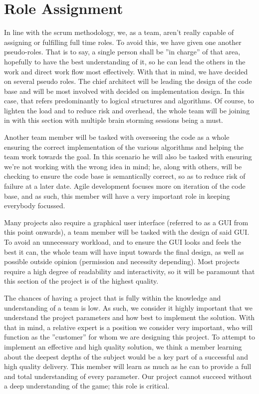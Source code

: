 \documentclass[11pt]{article}
\begin{document}
\section{Role Assignment}

In line with the scrum methodology, we, as a team, aren’t really 
capable of assigning or fulfilling full time roles. To avoid this, 
we have given one another pseudo-roles. That is to say, a single person 
shall be ”in charge” of that area, hopefully to have the best 
understanding of it, so he can lead the others in the work and direct 
work flow most effectively.
	With that in mind, we have decided on several pseudo roles. The 
chief architect will be leading the design of the code base and will be 
most involved with decided on implementation design. In this case, that 
refers predominantly to logical structures and algorithms. Of course, 
to lighten the load and to reduce risk and overhead, the whole team will 
be joining in with this section with multiple brain storming sessions 
being a must.

Another team member will be tasked with overseeing the code as a whole 
ensuring the correct implementation of the various algorithms and helping 
the team work towards the goal. In this scenario he will also be tasked 
with ensuring we’re not working with the wrong idea in mind; he, along 
with others, will be checking to ensure the code base is semantically 
correct, so as to reduce risk of failure at a later date. Agile 
development focuses more on iteration of the code base, and as such, this 
member will have a very important role in keeping everybody focussed.

Many projects also require a graphical user interface (referred to as a 
GUI from this point onwards), a team member will be tasked with the 
design of said GUI. To avoid an unnecessary workload, and to ensure the 
GUI looks and feels the best it can, the whole team will have input 
towards the final design, as well as possible outside opinion (permission 
and necessity depending). Most projects require a high degree of 
readability and interactivity, so it will be paramount that this section 
of the project is of the highest quality.

The chances of having a project that is fully within the knowledge and 
understanding of a team is low. As such, we consider it highly important 
that we understand the project parameters and how best to implement the 
solution. With that in mind, a relative expert is a position we consider 
very important, who will function as the ”customer” for whom we are 
designing this project. To attempt to implement an effective and high 
quality solution, we think a member learning about the deepest depths of 
the subject would be a key part of a successful and high quality delivery.
This member will learn as much as he can to provide a full and total 
understanding of every parameter. Our project cannot succeed without a 
deep understanding of the game; this role is critical.
\end{document}
